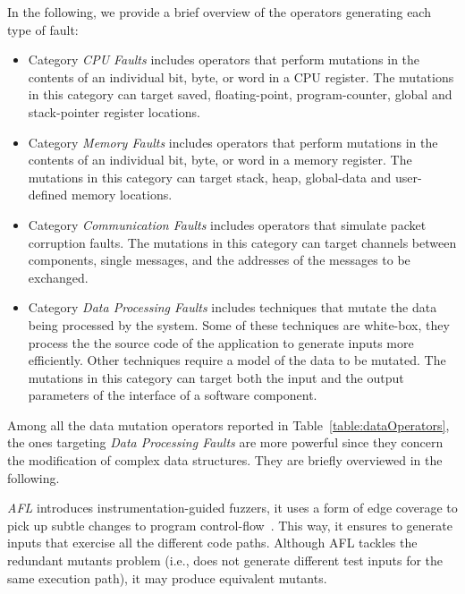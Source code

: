 In the following, we provide a brief overview of the operators generating each type of fault:
\begin{itemize}
	\item Category \emph{CPU Faults} includes operators that perform mutations in the contents of an individual bit, byte, or word in a CPU register. The mutations in this category can target saved, floating-point, program-counter, global and stack-pointer register locations. 
	\item Category \emph{Memory Faults} includes operators that perform mutations in the contents of an individual bit, byte, or word in a memory register. The mutations in this category can target stack, heap, global-data and user-defined memory locations.
	\item Category \emph{Communication Faults} includes operators that simulate packet corruption faults. The mutations in this category can target channels between components, single messages, and the addresses of the messages to be exchanged.
	\item Category \emph{Data Processing Faults} includes techniques that mutate the data being processed by the system. Some of these techniques are white-box, they process the the source code of the application to generate inputs more efficiently. Other techniques require a model of the data to be mutated. The mutations in this category can target both the input and the output parameters of the interface of a software component.
\end{itemize}



Among all the data mutation operators reported in Table~\ref{table:dataOperators}, the ones targeting \emph{Data Processing Faults} are more powerful since they concern the modification of complex data structures. They are briefly overviewed in the following.

\emph{AFL} introduces instrumentation-guided fuzzers, it uses a form of edge coverage to pick up subtle changes to program control-flow~\cite{gutmann2016fuzzing}. This way, it ensures to generate inputs that exercise all the different code paths.
Although AFL tackles the redundant mutants problem (i.e., does not generate different test inputs for the same execution path), it may produce equivalent mutants.

